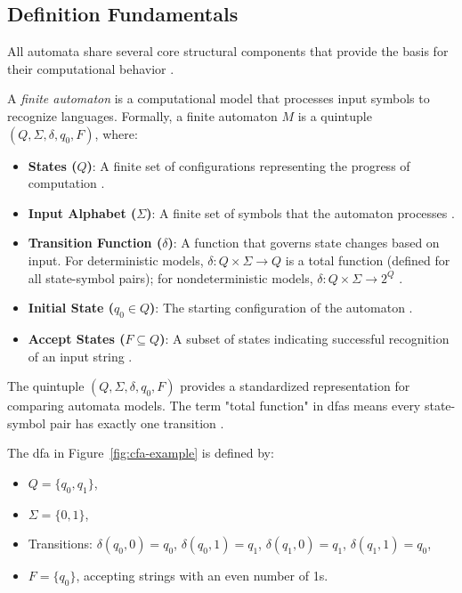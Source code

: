 \subsection{ Definition Fundamentals}
\label{subsec:automata-definition-fundamentals}

All automata share several core structural components that provide the basis for their computational behavior \cite{hopcroft2006introduction, sipser2013introduction}.

\begin{definition}
\label{def:finite-automaton}
A \textit{finite automaton} is a computational model that processes input symbols to recognize languages. Formally, a finite automaton $M$ is a quintuple $(Q, \Sigma, \delta, q_0, F)$, where:
\begin{itemize}
    \item \textbf{States ($Q$)}: A finite set of configurations representing the progress of computation \cite{sipser2013introduction}.
    \item \textbf{Input Alphabet ($\Sigma$)}: A finite set of symbols that the automaton processes \cite{hopcroft2006introduction, sudkamp2006languages}.
    \item \textbf{Transition Function ($\delta$)}: A function that governs state changes based on input. For deterministic models, $\delta: Q \times \Sigma \to Q$ is a total function (defined for all state-symbol pairs); for nondeterministic models, $\delta: Q \times \Sigma \to 2^Q$ \cite{sipser2013introduction}.
    \item \textbf{Initial State ($q_0 \in Q$)}: The starting configuration of the automaton \cite{hopcroft2006introduction}.
    \item \textbf{Accept States ($F \subseteq Q$)}: A subset of states indicating successful recognition of an input string \cite{sipser2013introduction}.
\end{itemize}
\end{definition}

\begin{remark}
The quintuple $(Q, \Sigma, \delta, q_0, F)$ provides a standardized representation for comparing automata models. The term "total function" in \glspl{dfa} means every state-symbol pair has exactly one transition \cite{sipser2013introduction}.
\end{remark}

\begin{example}
The \gls{dfa} in Figure~\ref{fig:cfa-example} is defined by:
\begin{itemize}
    \item $Q = \{q_0, q_1\}$,
    \item $\Sigma = \{0, 1\}$,
    \item Transitions: $\delta(q_0, 0) = q_0$, $\delta(q_0, 1) = q_1$, $\delta(q_1, 0) = q_1$, $\delta(q_1, 1) = q_0$,
    \item $F = \{q_0\}$, accepting strings with an even number of 1s.
\end{itemize}
\end{example}

